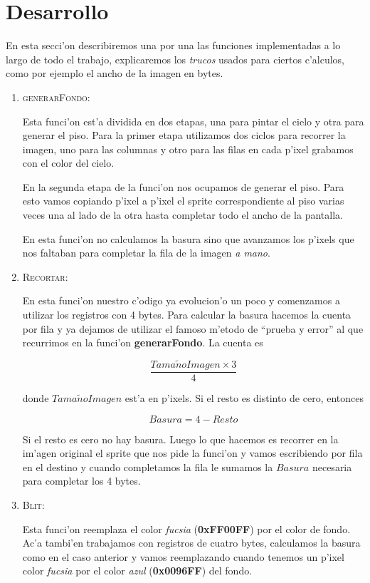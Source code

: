 \section{Desarrollo}
En esta secci'on describiremos una por una las funciones implementadas a lo largo de todo el trabajo, explicaremos los \textit{trucos} usados para ciertos c'alculos, como por ejemplo el ancho de la imagen en bytes.

\begin{enumerate}
 \item \textsc{generarFondo}:

Esta funci'on est'a dividida en dos etapas, una para pintar el cielo y otra
para generar el piso. Para la primer etapa utilizamos dos ciclos para recorrer
la imagen, uno para las columnas y otro para las filas en cada p'ixel grabamos
con el color del cielo.

En la segunda etapa de la funci'on nos ocupamos de generar el piso.  Para esto
vamos copiando p'ixel a p'ixel el sprite correspondiente al piso varias veces
una al lado de la otra hasta completar todo el ancho de la pantalla. 

En esta funci'on no calculamos la basura sino que avanzamos los p'ixels que nos
faltaban para completar la fila de la imagen \textit{a mano}.

\item \textsc{Recortar}:

En esta funci'on nuestro c'odigo ya evolucion'o un poco y comenzamos a utilizar
los registros con 4 bytes.  Para calcular la basura hacemos la cuenta por fila
y ya dejamos de utilizar el famoso m'etodo de ``prueba y error'' al que
recurrimos en la funci'on \textbf{generarFondo}.  La cuenta es 

$$
\frac{Tama\tilde{n}oImagen \times 3}{4}
$$

donde $Tama\tilde{n}oImagen$ est'a en p'ixels.  Si el resto es distinto de cero, entonces 

$$
Basura = 4 - Resto
$$

Si el resto es cero no hay basura. Luego lo que hacemos es recorrer en la
im'agen original el sprite que nos pide la funci'on y vamos escribiendo por fila
en el destino y cuando completamos la fila le sumamos la $Basura$ necesaria
para completar los 4 bytes.

\item \textsc{Blit}:

Esta funci'on reemplaza el color \textit{fucsia} (\textbf{0xFF00FF}) por el
color de fondo.  Ac'a tambi'en trabajamos con registros de cuatro bytes,
calculamos la basura como en el caso anterior y vamos reemplazando cuando
tenemos un p'ixel color \textit{fucsia} por el color \textit{azul}
(\textbf{0x0096FF}) del fondo.  


\end{enumerate}
